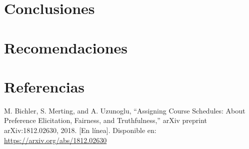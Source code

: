 \documentclass{article}
\begin{document}
\section{Conclusiones}\label{sec:concl}


\section{Recomendaciones}\label{secrecomen}


\section{Referencias}
\renewcommand{\refname}{}
\begin{thebibliography}{9}

 \label{ref:BPS} M. Bichler, S. Merting, and A. Uzunoglu, 
“Assigning Course Schedules: About Preference Elicitation, Fairness, and Truthfulness,” 
arXiv preprint arXiv:1812.02630, 2018. [En línea]. Disponible en: 
\url{https://arxiv.org/abs/1812.02630}



\end{thebibliography}
\end{document}
